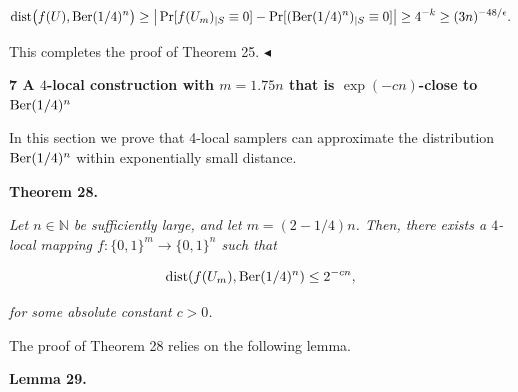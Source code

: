\documentclass[10pt,a4paper]{article}
\begin{document}
\[\begin{gathered}
\mathrm{dist}\bigl(f(U),\textnormal{Ber}(1/4)^{n}\bigr)\geq\big\lvert\Pr[f(U_{m})_{|S}\equiv 0]-\Pr[(\textnormal{Ber}(1/4)^{n})_{|S}\equiv 0]\big\rvert\geq 4^{-k}\geq(3n)^{-48/\epsilon}.
\end{gathered}\]


This completes the proof of Theorem 25.
$\blacktriangleleft$\par






\par\medskip\noindent\textbf{
7 A $4$-local construction with $m=1.75n$ that is $\exp(-cn)$-close to ${\textup{{Ber}}}(1/4)^{n}$
}\par




In this section we prove that 4-local samplers can
approximate the distribution $\textnormal{Ber}(1/4)^{n}$ within exponentially small distance.\par





\par\medskip\noindent\textbf{
\textbf{Theorem 28}\textbf{.}
}\par



\emph{Let $n\in\mathbb{N}$ be sufficiently large, and let $m=(2-1/4)n$.
Then, there exists a $4$-local mapping $f\colon\{0,1\}^{m}\to\{0,1\}^{n}$ such that}\par


\[\begin{gathered}
\mathrm{dist}(f(U_{m}),\textnormal{Ber}(1/4)^{n})\leq 2^{-cn},
\end{gathered}\]


\emph{for some absolute constant $c>0$.}\par






The proof of Theorem 28 relies on the following lemma.\par





\par\medskip\noindent\textbf{
\textbf{Lemma 29}\textbf{.}
}\par
\end{document}
